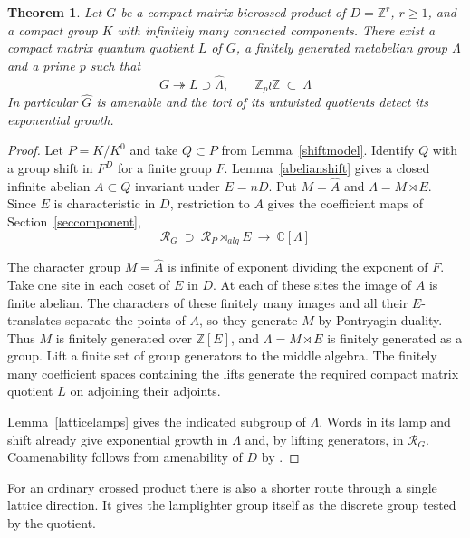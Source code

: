 \documentclass[11pt,a4paper]{article}
\newtheorem{thm}{Theorem}[section]
\theoremstyle{remark}
\begin{document}
\begin{thm}\label{latticegrowth}
Let $G$ be a compact matrix bicrossed product of $D=\mathbb Z^r$, $r\ge1$,
and a compact group $K$ with infinitely many connected components.
There exist a compact matrix quantum quotient $L$ of $G$, a finitely
generated metabelian group $\Lambda$ and a prime $p$ such that
\[
 G\twoheadrightarrow L\supset\widehat\Lambda,\qquad
 \mathbb Z_p\wr\mathbb Z\ \subset\ \Lambda
\]
In particular $\widehat G$ is amenable and the tori of its untwisted
quotients detect its exponential growth.
\end{thm}
\begin{proof}

Let $P=K/K^0$ and take $Q\subset P$ from Lemma~\ref{shiftmodel}.
Identify $Q$ with a group shift in $F^D$ for a finite group $F$. Lemma~\ref{abelianshift} gives
a closed infinite abelian $A\subset Q$ invariant under $E=nD$.
Put $M=\widehat A$ and $\Lambda=M\rtimes E$. Since $E$ is characteristic
in $D$, restriction to $A$ gives the coefficient maps of Section~\ref{seccomponent},
\[
 \mathcal R_G\ \supset\ \mathcal R_P\rtimes_{alg}E
        \ \longrightarrow\ \mathbb C[\Lambda]
\]

The character group $M=\widehat A$ is infinite of exponent dividing the
exponent of $F$. Take one site in each coset of $E$ in $D$. At each of
these sites the image of $A$ is finite abelian. The characters of these
finitely many images and all their $E$-translates separate the points of
$A$, so they generate $M$ by Pontryagin duality. Thus $M$ is finitely
generated over $\mathbb Z[E]$, and $\Lambda=M\rtimes E$ is finitely
generated as a group. Lift a finite set of group generators to the middle algebra.
The finitely many coefficient spaces containing the lifts generate the required compact matrix quotient $L$ on adjoining their adjoints.

Lemma~\ref{latticelamps} gives the indicated subgroup of $\Lambda$.
Words in its lamp and shift already give exponential growth in $\Lambda$
and, by lifting generators, in $\mathcal R_G$. Coamenability
follows from amenability of $D$ by \cite[Corollary~3.7]{fmp}.
\end{proof}

For an ordinary crossed product there is also a shorter route through a
single lattice direction. It gives the lamplighter group itself as the
discrete group tested by the quotient.
\end{document}
